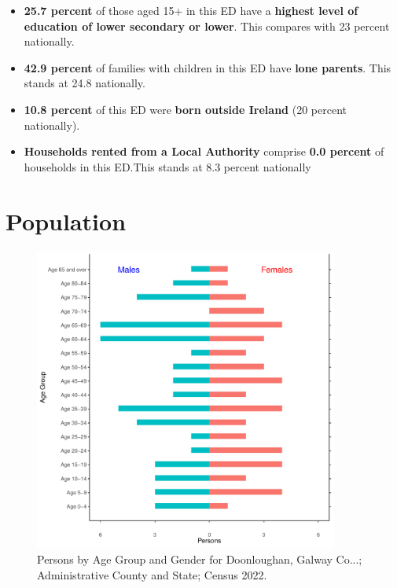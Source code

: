 \documentclass{article}
\begin{document}
\begin{itemize}
\item \textbf{25.7 percent} of those aged 15+ in this ED have a \textbf{highest level of education of lower secondary or lower}. This compares with 23 percent nationally. 

\item \textbf{42.9 percent} of families with children in this ED have \textbf{lone parents}. This stands at 24.8 nationally.

\item \textbf{10.8 percent} of this ED were \textbf{born outside Ireland} (20 percent nationally).

\item \textbf{Households rented from a Local Authority} comprise \textbf{0.0 percent} of households in this ED.This stands at 8.3 percent nationally

\end{itemize}

\pagebreak

\section{Population} 
\label{sect:Pop}

\begin{figure}[h]
	\centering
	\includegraphics[width = 100mm]{../figures/PyramidPlot.pdf}
	\caption{Persons by Age Group and Gender for Doonloughan, Galway Co...; Administrative County and State; Census 2022.}
	\label{fig:2ae19629-1a6a-13a3-e055-000000000001}
	\end{figure}
\end{document}
